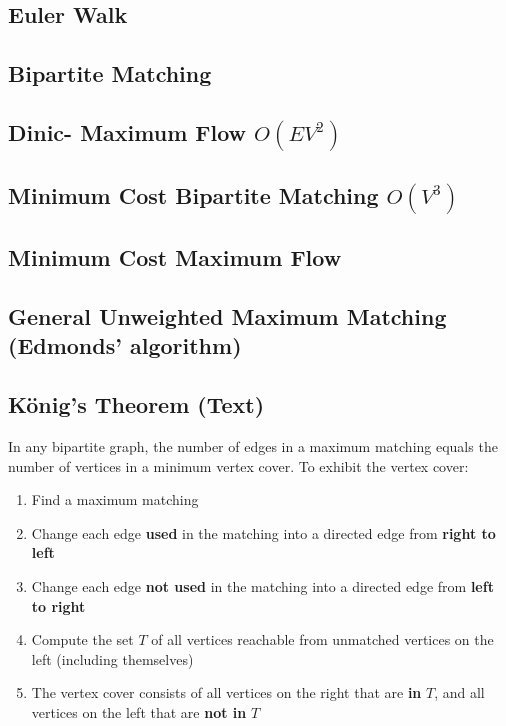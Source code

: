 \documentclass[12pt]{extarticle}
\begin{document}
\begin{multicols*}{2}
\subsection{Euler Walk} %


\subsection{Bipartite Matching} %


\subsection{Dinic- Maximum Flow $O(EV^2)$ } %


\subsection{Minimum Cost Bipartite Matching $O(V^3)$ } %


\subsection{Minimum Cost Maximum Flow } %


\subsection{General Unweighted Maximum Matching (Edmonds' algorithm)}


\subsection{K\"onig's Theorem (Text)} %
In any bipartite graph, the number of edges in a maximum matching equals the
number of vertices in a minimum vertex cover. To exhibit the vertex cover:
\begin{enumerate}
\item Find a maximum matching
\item Change each edge \textbf{used} in the matching into a directed edge from
\textbf{right to left}
\item Change each edge \textbf{not used} in the matching into a directed edge
from \textbf{left to right}
\item Compute the set $T$ of all vertices reachable from unmatched vertices on
the left (including themselves)
\item The vertex cover consists of all vertices on the right that are
\textbf{in} $T$, and all vertices on the left that are \textbf{not in} $T$
\end{enumerate}


\end{multicols*}
\end{document}
